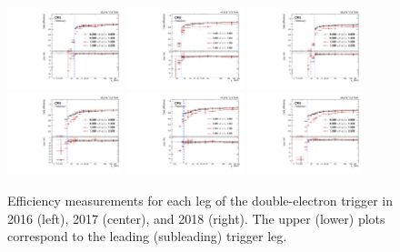 \begin{figure}[tb]
	\begin{center}
		\includegraphics[width=0.30\textwidth]{fig/SFs/2016_ele_trg1_1D.pdf}
		\includegraphics[width=0.30\textwidth]{fig/SFs/2017_ele_trg1_1D.pdf}
		\includegraphics[width=0.30\textwidth]{fig/SFs/2018_ele_trg1_1D.pdf}
		\includegraphics[width=0.30\textwidth]{fig/SFs/2016_ele_trg2_1D.pdf}
		\includegraphics[width=0.30\textwidth]{fig/SFs/2017_ele_trg2_1D.pdf}
		\includegraphics[width=0.30\textwidth]{fig/SFs/2018_ele_trg2_1D.pdf}
	\end{center}
	\caption{Efficiency measurements for each leg of the double-electron trigger in 2016 (left), 2017 (center), and 2018 (right). The upper (lower) plots correspond to the 
	leading (subleading) trigger leg.}
	\label{fig:ele_trig_SF}
\end{figure}


